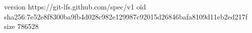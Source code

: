 version https://git-lfs.github.com/spec/v1
oid sha256:7e52e8f8300ba9fb4d028c982e129987c92015d26846bafa8109d11eb2ed217f
size 786528
